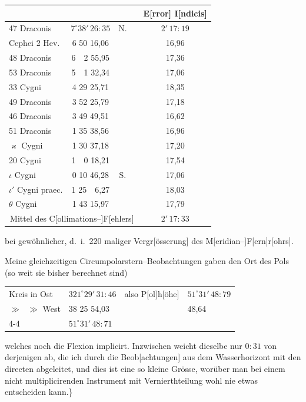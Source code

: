 \documentclass[12pt,a4paper]{article}
\theoremstyle{plain}
\theoremstyle{definition}
\theoremstyle{remark}
\begin{document}
\begin{center}
\begin{tabular}{l c c | l c}
\toprule
& & & & E[rror] I[ndicis] \\
\midrule
47 Draconis & $7^\circ 38'\,26\!\!:\!\!35$ & N. & & $2'\,17\!\!:\!\!19$ \\
Cephei 2 Hev. & 6 50 16,06 & & & 16,96 \\
48 Draconis & 6\ \ 2 55,95 & & & 17,36 \\
53 Draconis & 5\ \ 1 32,34 & & & 17,06 \\
33 Cygni & 4 29 25,71 & & & 18,35 \\
49 Draconis & 3 52 25,79 & & & 17,18 \\
46 Draconis & 3 49 49,51 & & & 16,62 \\
51 Draconis & 1 35 38,56 & & & 16,96 \\
$\varkappa$ Cygni & 1 30 37,18 & & & 17,20 \\
20 Cygni & 1\ \ 0 18,21 & & & 17,54 \\
$\iota$ Cygni & 0 10 46,28 & S. & & 17,06 \\
$\iota'$ Cygni praec. & 1 25\ \ 6,27 & & & 18,03 \\
$\theta$ Cygni & 1 43 15,97 & & & 17,79 \\
\midrule
\multicolumn{4}{c}{Mittel des C[ollimations--]F[ehlers]} & $2'\,17\!\!:\!\!33$ \\
\bottomrule
\end{tabular}
\end{center}

bei gew\"{o}hnlicher, d.\ i.\ 220 maliger Vergr[\"{o}sserung] des M[eridian--]F[ern]r[ohrs].

Meine gleichzeitigen Circumpolarstern--Beobachtungen gaben den Ort des
Pols (so weit sie bisher berechnet sind)
\begin{center}
\begin{tabular}{l l l l}
Kreis in Ost & $321^\circ 29'\,31\!\!:\!\!46$ & also P[ol]h[\"{o}he] & $51^\circ 31'\,48\!\!:\!\!79$ \\
\quad\quad\quad$\mathit{\gg\ \ \ \gg}$ West & 38 25 54,03 & & 48,64 \\ \cline{4-4}
\multicolumn{3}{r}{Mittel} & $51^\circ 31'\,48\!\!:\!\!71$ \\
\end{tabular}
\end{center}

welches noch die Flexion implicirt. Inzwischen weicht dieselbe nur $0\!\!:\!\!31$ von
derjenigen ab, die ich durch die Beob[achtungen] aus dem Wasserhorizont mit
den directen abgeleitet, und dies ist eine so kleine Gr\"{o}sse, wor\"{u}ber man bei
einem nicht multiplicirenden Instrument mit Vernierthteilung wohl nie etwas
entscheiden kann.\}
\end{document}
